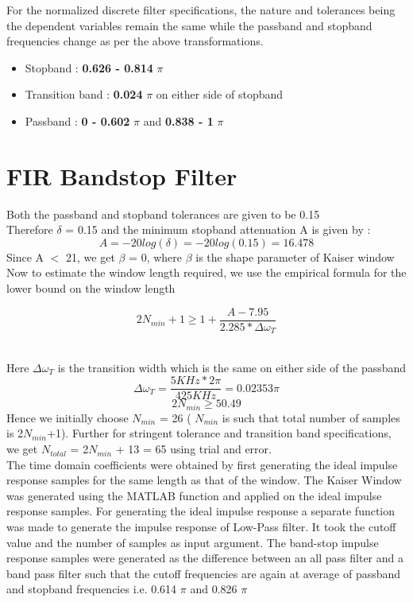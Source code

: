 \documentclass{article}
\begin{document}
\vspace{1em}
\noindent
For the normalized discrete filter specifications, the nature and tolerances being the dependent variables remain the same while the passband and stopband frequencies change as per the above transformations. 
\begin{itemize}
    \item Stopband : \textbf{0.626 -  0.814} {$\pi$}
    \item  Transition band : \textbf{0.024} $\pi$ on either side of stopband
    \item Passband : \textbf{0 - 0.602} {$\pi$} and \textbf{0.838 - 1} {$\pi$}
\end{itemize}

\section{FIR Bandstop Filter}

Both the passband and stopband tolerances are given to be 0.15\\
Therefore $\delta$ = 0.15 and the minimum stopband attenuation A is given by :
\begin{equation*}
    A = -20log(\delta) = -20log(0.15) = 16.478 
\end{equation*}
Since A $<$ 21, we get $\beta$ = 0, where $\beta$ is the shape parameter of Kaiser window
Now to estimate the window length required, we use the empirical formula for the lower bound on
the window length

\begin{equation*}
    2N_{min} + 1 \geq 1+ \frac{A - 7.95}{2.285*\Delta \omega_T}
\end{equation*}\

Here $\Delta \omega_T$ is the transition width which is the same on either side of the passband
\begin{equation*}
    \Delta \omega_T = \frac{5KHz*2 \pi}{425KHz} = 0.02353 \pi
\end{equation*}
\begin{equation*}
    2N_{min} \geq 50.49 
\end{equation*}
Hence we initially choose $N_{min}$ = 26 ( $N_{min}$ is such that total number of samples is 2$N_{min}$+1). Further for stringent tolerance and transition band specifications, we get $N_{total}$ = 2$N_{min}$ + 13 = 65 using trial and error.\\

The time domain coefficients were obtained by first generating the ideal impulse response samples
for the same length as that of the window. The Kaiser Window was generated using the MATLAB
function and applied on the ideal impulse response samples. For generating the ideal impulse response a separate function was made to generate the impulse response of Low-Pass filter. It took the cutoff value and the number of samples as input argument. The band-stop impulse response samples were generated as the difference between an all pass filter and a band pass filter such that the cutoff frequencies are again at average of passband and stopband frequencies i.e. 0.614 $\pi$ and 0.826 $\pi$
\end{document}
